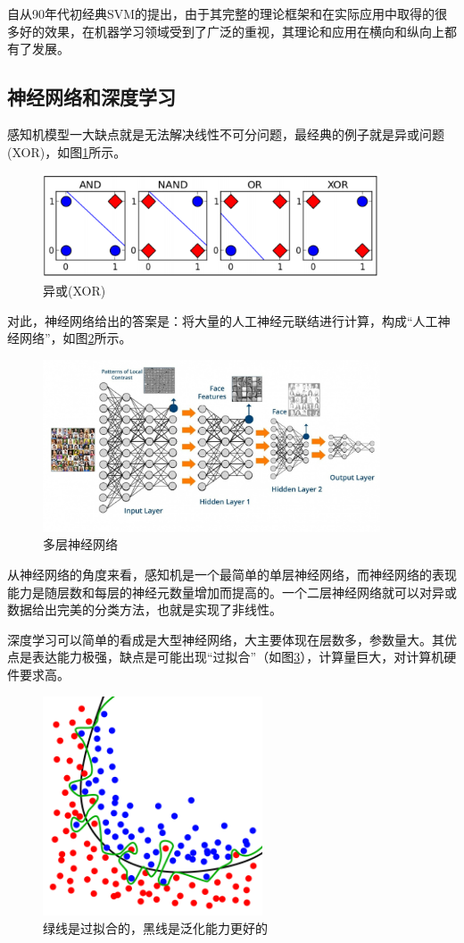 \documentclass[a4paper,8pt]{article}
\begin{document}
自从90年代初经典SVM的提出，由于其完整的理论框架和在实际应用中取得的很多好的效果，在机器学习领域受到了广泛的重视，其理论和应用在横向和纵向上都有了发展。

\subsection{神经网络和深度学习}

感知机模型一大缺点就是无法解决线性不可分问题，最经典的例子就是异或问题(XOR)，如图\ref{fig:XOR}所示。
\begin{figure}[htbp]
\centering
\includegraphics[width=10cm]{./fig/XOR.png}
\caption{异或(XOR)}\label{fig:XOR}
\end{figure}

对此，神经网络给出的答案是：将大量的人工神经元联结进行计算，构成“人工神经网络”，如图\ref{fig:net}所示。

\begin{figure}[htbp]
\centering
\includegraphics[width=10cm]{./fig/net.jpg}
\caption{多层神经网络}\label{fig:net}
\end{figure}

从神经网络的角度来看，感知机是一个最简单的单层神经网络，而神经网络的表现能力是随层数和每层的神经元数量增加而提高的。一个二层神经网络就可以对异或数据给出完美的分类方法，也就是实现了非线性。

深度学习可以简单的看成是大型神经网络，大主要体现在层数多，参数量大。其优点是表达能力极强，缺点是可能出现“过拟合”（如图\ref{fig:overfitting}），计算量巨大，对计算机硬件要求高。

\begin{figure}[htbp]
\centering
\includegraphics[width=6.5cm]{./fig/Overfitting.png}
\caption{绿线是过拟合的，黑线是泛化能力更好的}\label{fig:overfitting}
\end{figure}
\end{document}
